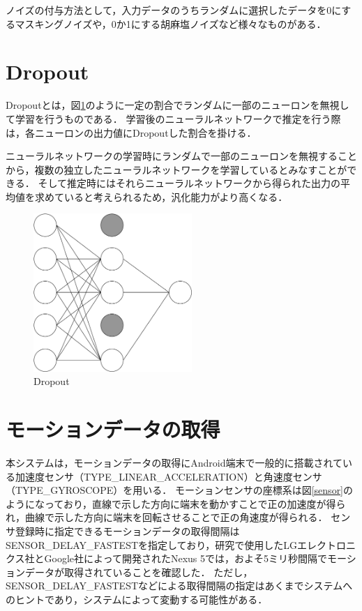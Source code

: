 ノイズの付与方法として，入力データのうちランダムに選択したデータを0にするマスキングノイズや，0か1にする胡麻塩ノイズなど様々なものがある．

\section{Dropout}
Dropoutとは，図\ref{dropout}のように一定の割合でランダムに一部のニューロンを無視して学習を行うものである．
学習後のニューラルネットワークで推定を行う際は，各ニューロンの出力値にDropoutした割合を掛ける．

ニューラルネットワークの学習時にランダムで一部のニューロンを無視することから，複数の独立したニューラルネットワークを学習しているとみなすことができる．
そして推定時にはそれらニューラルネットワークから得られた出力の平均値を求めていると考えられるため，汎化能力がより高くなる．

\begin{figure}[hbtp]
  \centering
  \includegraphics[bb=0 0 507 506, width=6cm]{Figures/dropout.pdf}
  \caption{Dropout}
  \label{dropout}
\end{figure}

\section{モーションデータの取得}
本システムは，モーションデータの取得にAndroid端末で一般的に搭載されている加速度センサ（TYPE\_LINEAR\_ACCELERATION）と角速度センサ（TYPE\_GYROSCOPE）を用いる．
モーションセンサの座標系は図\ref{sensor}のようになっており，直線で示した方向に端末を動かすことで正の加速度が得られ，曲線で示した方向に端末を回転させることで正の角速度が得られる\cite{3-sensor-coordinate}．
センサ登録時に指定できるモーションデータの取得間隔はSENSOR\_DELAY\_FASTESTを指定しており，研究で使用したLGエレクトロニクス社とGoogle社によって開発されたNexus 5では，およそ5ミリ秒間隔でモーションデータが取得されていることを確認した．
ただし，SENSOR\_DELAY\_FASTESTなどによる取得間隔の指定はあくまでシステムへのヒントであり，システムによって変動する可能性がある\cite{3-sensor-delay}．

